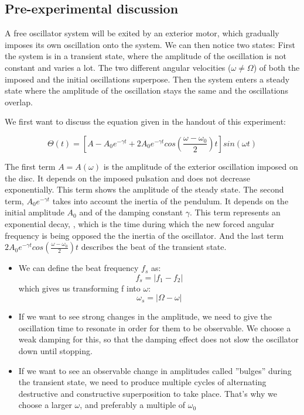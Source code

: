 \documentclass{scrartcl}
\begin{document}
\subsection{Pre-experimental discussion}

A free oscillator system will be exited by an exterior motor, which gradually imposes its own oscillation onto the system. We can then notice two states: First the system is in a transient state, where the amplitude of the oscillation is not constant and varies a lot. The two different angular velocities ($\omega \neq \Omega$) of both the imposed and the initial oscillations superpose. Then the system enters a steady state where the amplitude of the oscillation stays the same and the oscillations overlap.

We first want to discuss the equation given in the handout of this experiment:

\begin{equation}
    \Theta(t)=[A-A_0e^{-\gamma t}+2A_0e^{-\gamma t}cos(\frac{\omega-\omega_0}{2})t]sin(\omega t)
\end{equation}

The first term $A=A(\omega)$ is the amplitude of the exterior oscillation imposed on the disc. It depends on the imposed pulsation and does not decrease exponentially. This term shows the amplitude of the steady state.
The second term, $A_0e^{-\gamma t}$ takes into account the inertia of the pendulum. It depends on the initial amplitude $A_0$ and of the damping constant $\gamma$. This term represents an exponential decay, , which is the time during which the new forced angular frequency is being opposed the the inertia of the oscillator.
And the last term $2A_0e^{-\gamma t}cos(\frac{\omega-\omega_0}{2})t$ describes the beat of the transient state.

\begin{itemize}
    \item We can define the beat frequency $f_s$ as:
    \begin{equation}
        f_s=|f_1-f_2|\nonumber
    \end{equation}
    which gives us transforming f into $\omega$:
    \begin{equation}
        \omega_s=|\Omega-\omega|\nonumber
    \end{equation}
    \item If we want to see strong changes in the amplitude, we need to give the oscillation time to resonate in order for them to be observable.  We choose a weak damping for this, so that the damping effect does not slow the oscillator down until stopping.
    \item If we want to see an observable change in amplitudes called ”bulges” during the transient state, we need to produce multiple  cycles  of  alternating  destructive  and  constructive  superposition  to  take  place. That’s why we choose a larger $\omega$, and preferably a multiple of $\omega_0$
\end{itemize}
\end{document}
